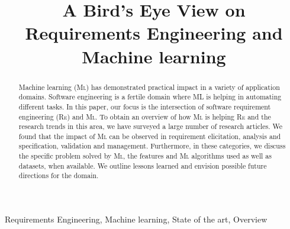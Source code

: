 \documentclass[conference]{IEEEtran}
\newcommand{\RE}{\textsc{Re}\xspace}
\newcommand{\ML}{\textsc{Ml}\xspace}
\begin{document}
\title{A Bird’s Eye View on Requirements Engineering and Machine learning} 

\author{
\and
{} 
\and
{}
}   
\maketitle

\begin{abstract}
Machine learning (\ML) has demonstrated practical impact in a variety of
application domains. Software engineering is a fertile domain where ML is
helping in automating  different tasks. In this paper, our focus is the
intersection of software requirement engineering (\RE) and \ML. To obtain an
overview of how \ML is helping \RE and the research trends in this area, we have
surveyed a large number of research articles. We found that the impact of \ML
can be observed in requirement elicitation, analysis and specification, validation
and management. Furthermore, in these categories, we discuss the specific
problem solved by \ML, the features and \ML algorithms used as well as datasets,
when available. We outline lessons learned and envision possible future directions
for the domain.
\end{abstract}  

\begin{IEEEkeywords}
Requirements Engineering, Machine learning, State of the art, Overview
\end{IEEEkeywords}
  
 
 
   
 
  
 
  
\end{document}
